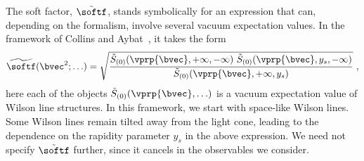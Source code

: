 The soft factor, $\tilde \softf$, stands symbolically for an
expression that can, depending on the formalism, involve several vacuum
expectation values. In the framework of Collins and Aybat~\cite{Aybat:2011zv,CollinsBook2011,Aybat:2011ge}, it takes the form
\begin{equation}
\widetilde{\softf}(\bvec^2;\ldots) = 
  \sqrt{ \frac
    { \tilde S_{(0)}( \vprp{\bvec}, + \infty, -\infty )\ \tilde S_{(0)}( \vprp{\bvec}, y_s, -\infty ) }
    { \tilde S_{(0)}( \vprp{\bvec}, + \infty, y_s ) }
  } \ ,
\end{equation}
here each of the objects $\tilde S_{(0)}( \vprp{\bvec}, \ldots )$ is a
vacuum expectation value of Wilson line structures.
In this framework, we start with space-like Wilson lines. Some Wilson lines remain tilted away from the light cone, leading to the dependence on the rapidity parameter $y_s$ in the above expression. We need not specify $\tilde \softf$ further, since it cancels in the observables we consider.

